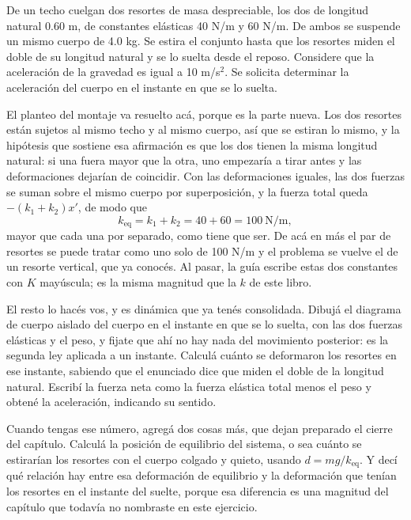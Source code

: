 \documentclass[11pt,openany]{book}
\begin{document}
\begin{ejemplo}[parcial]
De un techo cuelgan dos resortes de masa despreciable, los dos de longitud natural 0.60 m, de constantes elásticas 40 N/m y 60 N/m. De ambos se suspende un mismo cuerpo de 4.0 kg. Se estira el conjunto hasta que los resortes miden el doble de su longitud natural y se lo suelta desde el reposo. Considere que la aceleración de la gravedad es igual a 10 m/s$^2$. Se solicita determinar la aceleración del cuerpo en el instante en que se lo suelta.

El planteo del montaje va resuelto acá, porque es la parte nueva. Los dos resortes están sujetos al mismo techo y al mismo cuerpo, así que se estiran lo mismo, y la hipótesis que sostiene esa afirmación es que los dos tienen la misma longitud natural: si una fuera mayor que la otra, uno empezaría a tirar antes y las deformaciones dejarían de coincidir. Con las deformaciones iguales, las dos fuerzas se suman sobre el mismo cuerpo por superposición, y la fuerza total queda $-(k_1+k_2)x'$, de modo que
\[
k_{\text{eq}} = k_1 + k_2 = 40 + 60 = 100\ \mathrm{N/m} ,
\]
mayor que cada una por separado, como tiene que ser. De acá en más el par de resortes se puede tratar como uno solo de 100 N/m y el problema se vuelve el de un resorte vertical, que ya conocés. Al pasar, la guía escribe estas dos constantes con $K$ mayúscula; es la misma magnitud que la $k$ de este libro.

El resto lo hacés vos, y es dinámica que ya tenés consolidada. Dibujá el diagrama de cuerpo aislado del cuerpo en el instante en que se lo suelta, con las dos fuerzas elásticas y el peso, y fijate que ahí no hay nada del movimiento posterior: es la segunda ley aplicada a un instante. Calculá cuánto se deformaron los resortes en ese instante, sabiendo que el enunciado dice que miden el doble de la longitud natural. Escribí la fuerza neta como la fuerza elástica total menos el peso y obtené la aceleración, indicando su sentido.

Cuando tengas ese número, agregá dos cosas más, que dejan preparado el cierre del capítulo. Calculá la posición de equilibrio del sistema, o sea cuánto se estirarían los resortes con el cuerpo colgado y quieto, usando $d = mg/k_{\text{eq}}$. Y decí qué relación hay entre esa deformación de equilibrio y la deformación que tenían los resortes en el instante del suelte, porque esa diferencia es una magnitud del capítulo que todavía no nombraste en este ejercicio.
\end{ejemplo}
\end{document}
